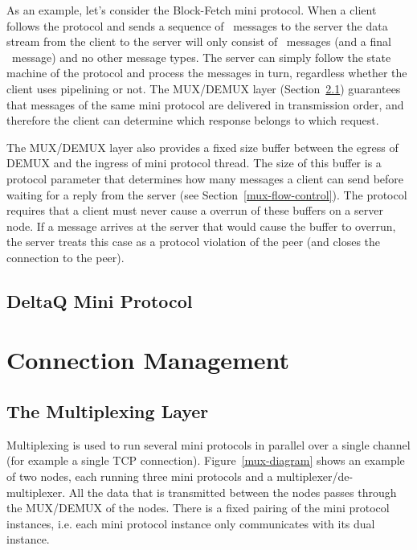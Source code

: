 \documentclass{report}
\newcommand{\wip}[1]{}
\newcommand{\hide}[1]{}
\newcommand{\wip}[1]{\color{magenta}{#1}\color{black}}
\newcommand{\hide}[1]{}
\theoremstyle{definition}{
  \newtheorem{lemma}{Lemma}[section] %
  \newtheorem{definition}[lemma]{Definition}
}
\theoremstyle{theorem}{
  \newtheorem{invariant}[lemma]{Invariant}
  \newtheorem{proofobligation}[lemma]{Proof Obligation}
}
\numberwithin{equation}{lemma}
\begin{document}
As an example, let's consider the Block-Fetch mini protocol.
When a client follows the protocol and sends a sequence of \RequestRange~messages to the server
the data stream from the client to the server will only consist of \RequestRange~messages
(and a final \ClientDone~message) and no other message types.
The server can simply follow the state machine of the protocol and process the messages in turn,
regardless whether the client uses pipelining or not.
The MUX/DEMUX layer (Section~\ref{multiplexing-section}) guarantees
that messages of the same mini protocol are delivered in transmission order,
and therefore the client can determine which response belongs to which request.

The MUX/DEMUX layer also provides a fixed size buffer between the egress of DEMUX and the ingress
of mini protocol thread.
The size of this buffer is a protocol parameter that determines how many messages
a client can send before waiting for a reply from the server (see Section~\ref{mux-flow-control}).
The protocol requires that a client must never cause a overrun of these buffers on a server node.
If a message arrives at the server that would cause the buffer to overrun,
the server treats this case as a protocol violation of the peer
(and closes the connection to the peer).
\hide{
The buffer sizes are listed in Table~\ref{bla} in Section~\ref{blub}.
}
\section{DeltaQ Mini Protocol}
\wip{
  WIP : Explain DeltaQ measurement back pressure and how we deal with slow connection.
  See Section~\ref{deltaq-discussion}.
The DeltaQ mini protocol does not transmit is own messages.
Instead it relies on the time stamps that the multiplexing layer (Section~\ref{multiplexing}) adds
to the messages of other mini protocols.
}

\chapter{Connection Management}
\label{connection-management}

\section{The Multiplexing Layer}
\label{multiplexing-section}
Multiplexing is used to run several mini protocols in parallel over a single
channel (for example a single TCP connection).
Figure~\ref{mux-diagram} shows an example of two nodes, each running three
mini protocols and a multiplexer/de-multiplexer.
All the data that is transmitted between the nodes passes through the MUX/DEMUX of the nodes.
There is a fixed pairing of the mini protocol instances, i.e. each mini protocol instance only
communicates with its dual instance.
\end{document}
